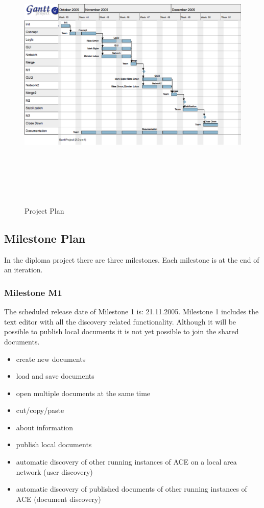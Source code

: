 \documentclass[11pt,a4paper]{article}
\begin{document}
\begin{figure}[H]
 \centering
 \includegraphics[height=379pt,width=585pt,angle=90]{../images/projectmanagement/gantt.eps}
 \caption{Project Plan}
\end{figure}
\newpage

\subsection{Milestone Plan}
\label{sect:Milestone Plan}

In the diploma project there are three milestones. Each milestone is at the end of an iteration.

\subsubsection{Milestone M1}

The scheduled release date of Milestone 1 is: 21.11.2005. Milestone 1 includes the text editor with
all the discovery related functionality. Although it will be possible to publish local documents
it is not yet possible to join the shared documents.

\begin{itemize}
 \item create new documents
 \item load and save documents
 \item open multiple documents at the same time
 \item cut/copy/paste
 \item about information
 \item publish local documents
 \item automatic discovery of other running instances of ACE on a local area network (user discovery)
 \item automatic discovery of published documents of other running instances of ACE (document discovery)
\end{itemize}
\end{document}
